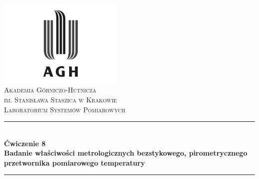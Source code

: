 \begin{titlepage}

\newcommand{\HRule}{\rule{\linewidth}{0.5mm}}

\center
 

\includegraphics[width=6cm]{../res/img/logo.png}\\[1cm]
 
 

\textsc{\LARGE Akademia Górniczo-Hutnicza \\[0.2cm]
im. Stanisława Staszica w Krakowie}\\[1.5cm]

\textsc{\Large Laboratorium Systemów Pomiarowych}\\[0.5cm]


\HRule \\[0.5cm]
{ \huge \bfseries Ćwiczenie 8 \\[0.5cm] \Large Badanie właściwości
metrologicznych bezstykowego, pirometrycznego przetwornika pomiarowego
temperatury}\\[0.3cm]
\HRule \\[1.5cm]


\end{titlepage}

